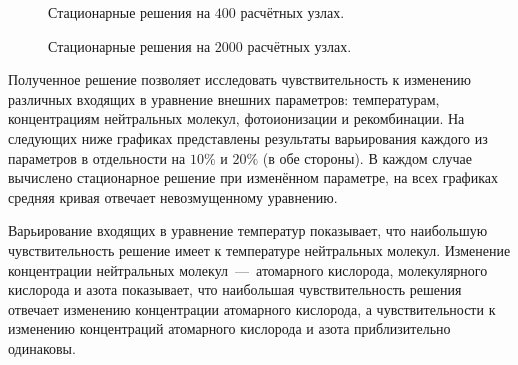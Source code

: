 \documentclass[14pt, a4paper, fleqn, twoside]{extreport}
\begin{document}
\begin{figure}[H]
\caption{Стационарные решения на $400$ расчётных узлах.}
\end{figure}

\begin{figure}[H]
\caption{Стационарные решения на $2000$ расчётных узлах.}
\end{figure}

Полученное решение позволяет исследовать чувствительность к изменению различных входящих в уравнение внешних параметров: температурам, концентрациям нейтральных молекул, фотоионизации и рекомбинации. На следующих ниже графиках представлены результаты варьирования каждого из параметров в отдельности на $10\%$ и $20\%$ (в обе стороны). В каждом случае вычислено стационарное решение при изменённом параметре, на всех графиках средняя кривая отвечает невозмущенному уравнению.

\medskip

Варьирование входящих в уравнение температур показывает, что наибольшую чувствительность решение имеет к температуре нейтральных молекул. Изменение концентрации нейтральных молекул~---~атомарного кислорода, молекулярного кислорода и азота показывает, что наибольшая чувствительность решения отвечает изменению концентрации атомарного кислорода, а чувствительности к изменению концентраций атомарного кислорода и азота приблизительно одинаковы.
\end{document}
